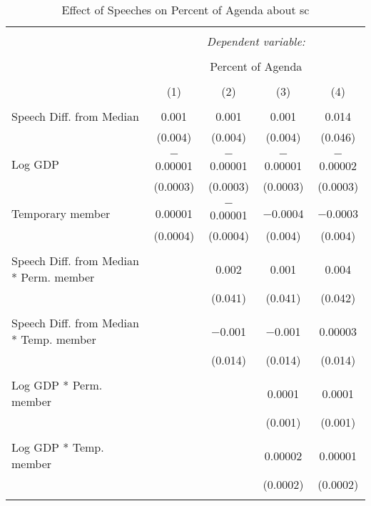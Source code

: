 
\begin{table}[!htbp] \centering 
  \caption{Effect of Speeches on Percent of Agenda about sc} 
  \label{} 
\begin{tabular}{@{\extracolsep{5pt}}lcccc} 
\\[-1.8ex]\hline 
\hline \\[-1.8ex] 
 & \multicolumn{4}{c}{\textit{Dependent variable:}} \\ 
\cline{2-5} 
\\[-1.8ex] & \multicolumn{4}{c}{Percent of Agenda} \\ 
\\[-1.8ex] & (1) & (2) & (3) & (4)\\ 
\hline \\[-1.8ex] 
 Speech Diff. from Median & 0.001 & 0.001 & 0.001 & 0.014 \\ 
  & (0.004) & (0.004) & (0.004) & (0.046) \\ 
  & & & & \\ 
 Log GDP & $-$0.00001 & $-$0.00001 & $-$0.00001 & $-$0.00002 \\ 
  & (0.0003) & (0.0003) & (0.0003) & (0.0003) \\ 
  & & & & \\ 
 Temporary member & 0.00001 & $-$0.00001 & $-$0.0004 & $-$0.0003 \\ 
  & (0.0004) & (0.0004) & (0.004) & (0.004) \\ 
  & & & & \\ 
 Speech Diff. from Median * Perm. member &  & 0.002 & 0.001 & 0.004 \\ 
  &  & (0.041) & (0.041) & (0.042) \\ 
  & & & & \\ 
 Speech Diff. from Median * Temp. member &  & $-$0.001 & $-$0.001 & 0.00003 \\ 
  &  & (0.014) & (0.014) & (0.014) \\ 
  & & & & \\ 
 Log GDP * Perm. member &  &  & 0.0001 & 0.0001 \\ 
  &  &  & (0.001) & (0.001) \\ 
  & & & & \\ 
 Log GDP * Temp. member &  &  & 0.00002 & 0.00001 \\ 
  &  &  & (0.0002) & (0.0002) \\ 
  & & & & \\ 

\end{tabular}
\end{table}
